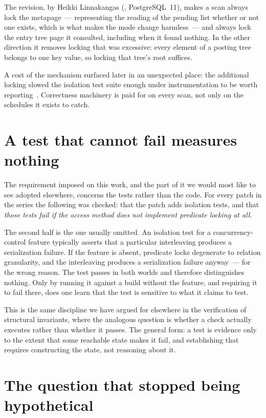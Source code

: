 The revision, by Heikki Linnakangas (, PostgreSQL~11), makes a
scan always lock the metapage~--- representing the reading of the pending list
whether or not one exists, which is what makes the mode change harmless~--- and
always lock the entry tree page it consulted, including when it found nothing.
In the other direction it removes locking that was excessive: every element of a
posting tree belongs to one key value, so locking that tree's root suffices.

A cost of the mechanism surfaced later in an unexpected place: the additional
locking slowed the isolation test suite enough under instrumentation to be worth
reporting~\cite{thread-predicate-gin-valgrind}. Correctness machinery is paid for
on every scan, not only on the schedules it exists to catch.

\section{A test that cannot fail measures nothing}
\label{sec:tests}

The requirement imposed on this work, and the part of it we would most like to
see adopted elsewhere, concerns the tests rather than the code. For every patch
in the series the following was checked: that the patch adds isolation tests, and
that \emph{those tests fail if the access method does not implement predicate
locking at all}.

The second half is the one usually omitted. An isolation test for a
concurrency-control feature typically asserts that a particular interleaving
produces a serialization failure. If the feature is absent, predicate locks
degenerate to relation granularity, and the interleaving produces a serialization
failure anyway~--- for the wrong reason. The test passes in both worlds and
therefore distinguishes nothing. Only by running it against a build without the
feature, and requiring it to fail there, does one learn that the test is
sensitive to what it claims to test.

This is the same discipline we have argued for elsewhere in the verification of
structural invariants, where the analogous question is whether a check actually
executes rather than whether it passes. The general form: a test is evidence only
to the extent that some reachable state makes it fail, and establishing that
requires constructing the state, not reasoning about it.

\section{The question that stopped being hypothetical}
\label{sec:deferred}

